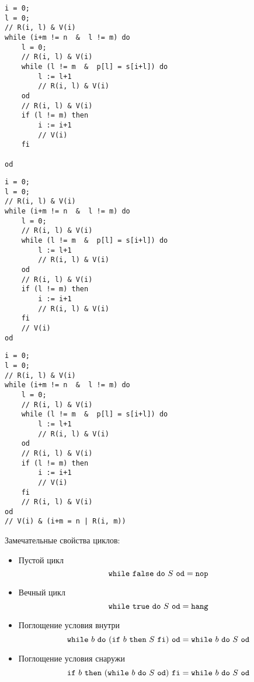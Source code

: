 \documentclass[landscape]{slides}
\begin{document}
\begin{slide}
\begin{verbatim}
i = 0;
l = 0;
// R(i, l) & V(i)
while (i+m != n  &  l != m) do
    l = 0;
    // R(i, l) & V(i)
    while (l != m  &  p[l] = s[i+l]) do
        l := l+1
        // R(i, l) & V(i)
    od
    // R(i, l) & V(i)
    if (l != m) then
        i := i+1
        // V(i)
    fi

od

\end{verbatim}
\end{slide}

\begin{slide}
\begin{verbatim}
i = 0;
l = 0;
// R(i, l) & V(i)
while (i+m != n  &  l != m) do
    l = 0;
    // R(i, l) & V(i)
    while (l != m  &  p[l] = s[i+l]) do
        l := l+1
        // R(i, l) & V(i)
    od
    // R(i, l) & V(i)
    if (l != m) then
        i := i+1
        // R(i, l) & V(i)
    fi
    // V(i)
od

\end{verbatim}
\end{slide}

\begin{slide}
\begin{verbatim}
i = 0;
l = 0;
// R(i, l) & V(i)
while (i+m != n  &  l != m) do
    l = 0;
    // R(i, l) & V(i)
    while (l != m  &  p[l] = s[i+l]) do
        l := l+1
        // R(i, l) & V(i)
    od
    // R(i, l) & V(i)
    if (l != m) then
        i := i+1
        // V(i)
    fi
    // R(i, l) & V(i)
od
// V(i) & (i+m = n | R(i, m))
\end{verbatim}
\end{slide}

\begin{slide}
    Замечательные свойства циклов:

    \begin{itemize}
    \item Пустой цикл
    \[
        \mathtt{while}\ {\mathtt{false}}\ \mathtt{do}\ {S}\ \mathtt{od} = \mathtt{nop}
    \]
    \item Вечный цикл
    \[
        \mathtt{while}\ {\mathtt{true}}\ \mathtt{do}\ {S}\ \mathtt{od} = \mathtt{hang}
    \]
    \item Поглощение условия внутри
    \[
        \mathtt{while}\ {b}\ \mathtt{do}\ {(\mathtt{if}\ {b}\ \mathtt{then}\ {S}\ \mathtt{fi})}\ \mathtt{od} = \mathtt{while}\ {b}\ \mathtt{do}\ {S}\ \mathtt{od}
    \]
    \item Поглощение условия снаружи
    \[
        \mathtt{if}\ {b}\ \mathtt{then}\ {(\mathtt{while}\ {b}\ \mathtt{do}\ {S}\ \mathtt{od})}\ \mathtt{fi} = \mathtt{while}\ {b}\ \mathtt{do}\ {S}\ \mathtt{od}
    \]
    \end{itemize}
\end{slide}
\end{document}
